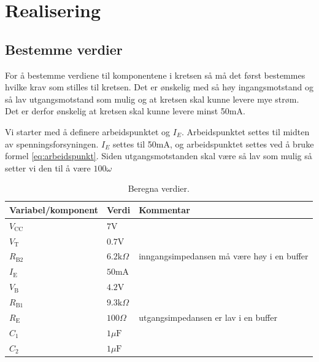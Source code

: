 \newpage
\section{Realisering}
\label{realiseringOgTest}

\subsection[short]{Bestemme verdier}
\label{bestemmeVerdier}

For å bestemme verdiene til komponentene i kretsen så må det først bestemmes hvilke krav som stilles til kretsen. Det er ønskelig med så høy ingangsmotstand og så lav utgangsmotstand som mulig og at kretsen skal kunne levere mye strøm. %
Det er derfor ønskelig at kretsen skal kunne levere minst 50mA.

Vi starter med å definere arbeidspunktet og $I_E$. Arbeidspunktet settes til midten av spenningsforsyningen. $I_E$ settes til 50mA, og arbeidspunktet settes ved å bruke formel \ref{eq:arbeidspunkt}. Siden utgangsmotstanden skal være så lav som mulig så setter vi den til å være $100\omega$


\vspace{1cm}
\begin{table}[!h]
\centering %
\caption{Beregna verdier.}
\label{tab:vars}	%
\begin{tabular}{lll} %
\toprule %
\textbf{Variabel/komponent} & \textbf{Verdi} & \textbf{Kommentar} \\
\midrule
$V_{\text{CC}}$ & $7\text{V}$ & \\
$V_\text{T}$ & $0.7\text{V}$ & \\
$R_{\text{B}2}$ & $6.2\text{k}\Omega$ & inngangsimpedansen må være høy i en buffer \\
$I_\text{E}$ & $50\text{mA}$ & \\
$V_\text{B}$ & $4.2\text{V}$ & \\
$R_{\text{B}1}$ & $9.3\text{k}\Omega$ & \\
$R_\text{E}$ & $100\Omega$ & utgangsimpedansen er lav i en buffer \\
$C_1$ & $1\mu\text{F}$ & \\
$C_2$ & $1\mu\text{F}$ & \\
\bottomrule 
\end{tabular}
\end{table}
\vspace{1cm}

